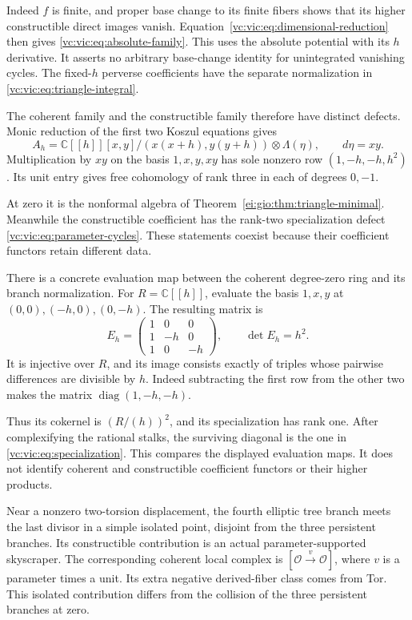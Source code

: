 Indeed $f$ is finite, and proper base change to its finite
fibers shows that its higher constructible direct images
vanish. Equation~\eqref{vc:vic:eq:dimensional-reduction} then
gives \eqref{vc:vic:eq:absolute-family}.
This uses the absolute potential with its $h$ derivative.
It asserts no arbitrary base-change identity for unintegrated
vanishing cycles. The fixed-$h$ perverse coefficients have
the separate normalization in \eqref{vc:vic:eq:triangle-integral}.

The coherent family and the constructible family therefore
have distinct defects. Monic reduction of the first two
Koszul equations gives
\[
 A_h=\mathbb C[[h]][x,y]/(x(x+h),y(y+h))
            \otimes\Lambda(\eta),\qquad d\eta=xy.
\]
Multiplication by $xy$ on the basis $1,x,y,xy$ has sole
nonzero row $(1,-h,-h,h^2)$. Its unit entry gives free
cohomology of rank three in each of degrees $0,-1$.

At zero it is the nonformal algebra of
Theorem~\ref{ei:gio:thm:triangle-minimal}.
Meanwhile the constructible coefficient has the rank-two
specialization defect \eqref{vc:vic:eq:parameter-cycles}.
These statements coexist because their coefficient functors
retain different data.

There is a concrete evaluation map between the coherent
degree-zero ring and its branch normalization. For
$R=\mathbb C[[h]]$, evaluate the basis $1,x,y$ at
$(0,0),(-h,0),(0,-h)$. The resulting matrix is
\begin{equation}\label{vc:vic:eq:coherent-evaluation}
 E_h=\begin{pmatrix}1&0&0\\1&-h&0\\1&0&-h\end{pmatrix},
 \qquad \det E_h=h^2.
\end{equation}
It is injective over $R$, and its image consists exactly of
triples whose pairwise differences are divisible by $h$.
Indeed subtracting the first row from the other two makes
the matrix $\operatorname{diag}(1,-h,-h)$.

Thus its cokernel is $(R/(h))^2$, and its specialization
has rank one. After complexifying the rational stalks,
the surviving diagonal is the one in
\eqref{vc:vic:eq:specialization}. This compares the displayed
evaluation maps. It does not identify coherent and
constructible coefficient functors or their higher products.

Near a nonzero two-torsion displacement, the fourth elliptic
tree branch meets the last divisor in a simple isolated point,
disjoint from the three persistent branches.
Its constructible contribution is an actual parameter-supported
skyscraper. The corresponding coherent local complex is
$[\mathcal O\xrightarrow{v}\mathcal O]$, where $v$ is a
parameter times a unit. Its extra negative derived-fiber
class comes from Tor. This isolated contribution differs
from the collision of the three persistent branches at zero.

